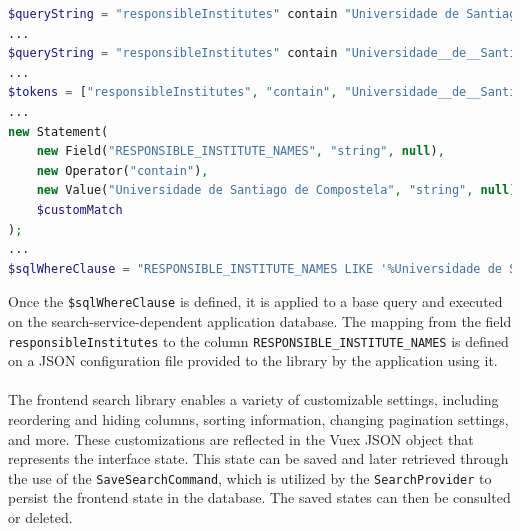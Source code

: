 \begin{lstlisting}[language=PHP, caption={Transformations to the query string input.}, label=lst:query]
$queryString = "responsibleInstitutes" contain "Universidade de Santiago de Compostela"
...
$queryString = "responsibleInstitutes" contain "Universidade__de__Santiago__de__Compostela"
...
$tokens = ["responsibleInstitutes", "contain", "Universidade__de__Santiago__de__Compostela"]
...
new Statement(
    new Field("RESPONSIBLE_INSTITUTE_NAMES", "string", null),
    new Operator("contain"),
    new Value("Universidade de Santiago de Compostela", "string", null),
    $customMatch
);
...
$sqlWhereClause = "RESPONSIBLE_INSTITUTE_NAMES LIKE '%Universidade de Santiago de Compostela%'"
\end{lstlisting}

\noindent
Once the \verb|$sqlWhereClause| is defined, it is applied to a base query and executed on the search-service-dependent application database. The mapping from the field \verb|responsibleInstitutes| to the column \verb|RESPONSIBLE_INSTITUTE_NAMES| is defined on a JSON configuration file provided to the library by the application using it.


\paragraph{} The frontend search library enables a variety of customizable settings, including reordering and hiding columns, sorting information, changing pagination settings, and more. These customizations are reflected in the Vuex JSON object that represents the interface state. This state can be saved and later retrieved through the use of the \verb|SaveSearchCommand|, which is utilized by the \verb|SearchProvider| to persist the frontend state in the database. The saved states can then be consulted or deleted.

